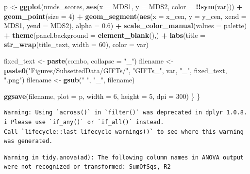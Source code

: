\documentclass[
]{book}
\newenvironment{Shaded}{\begin{snugshade}}{\end{snugshade}}
\newcommand{\AttributeTok}[1]{\textcolor[rgb]{0.13,0.29,0.53}{#1}}
\newcommand{\DecValTok}[1]{\textcolor[rgb]{0.00,0.00,0.81}{#1}}
\newcommand{\FloatTok}[1]{\textcolor[rgb]{0.00,0.00,0.81}{#1}}
\newcommand{\FunctionTok}[1]{\textcolor[rgb]{0.13,0.29,0.53}{\textbf{#1}}}
\newcommand{\NormalTok}[1]{#1}
\newcommand{\OtherTok}[1]{\textcolor[rgb]{0.56,0.35,0.01}{#1}}
\newcommand{\SpecialCharTok}[1]{\textcolor[rgb]{0.81,0.36,0.00}{\textbf{#1}}}
\newcommand{\StringTok}[1]{\textcolor[rgb]{0.31,0.60,0.02}{#1}}
\begin{document}
\begin{Shaded}
\begin{Highlighting}[]
\NormalTok{p }\OtherTok{\textless{}{-}} \FunctionTok{ggplot}\NormalTok{(nmds\_scores, }\FunctionTok{aes}\NormalTok{(}\AttributeTok{x =}\NormalTok{ MDS1, }\AttributeTok{y =}\NormalTok{ MDS2, }\AttributeTok{color =} \SpecialCharTok{!!}\FunctionTok{sym}\NormalTok{(var))) }\SpecialCharTok{+}
  \FunctionTok{geom\_point}\NormalTok{(}\AttributeTok{size =} \DecValTok{4}\NormalTok{) }\SpecialCharTok{+}
  \FunctionTok{geom\_segment}\NormalTok{(}\FunctionTok{aes}\NormalTok{(}\AttributeTok{x =}\NormalTok{ x\_cen, }\AttributeTok{y =}\NormalTok{ y\_cen,}
                   \AttributeTok{xend =}\NormalTok{ MDS1, }\AttributeTok{yend =}\NormalTok{ MDS2),}
               \AttributeTok{alpha =} \FloatTok{0.6}\NormalTok{) }\SpecialCharTok{+}
  \FunctionTok{scale\_color\_manual}\NormalTok{(}\AttributeTok{values =}\NormalTok{ palette) }\SpecialCharTok{+}
  \FunctionTok{theme}\NormalTok{(}\AttributeTok{panel.background =} \FunctionTok{element\_blank}\NormalTok{(),) }\SpecialCharTok{+}
  \FunctionTok{labs}\NormalTok{(}\AttributeTok{title =} \FunctionTok{str\_wrap}\NormalTok{(title\_text, }\AttributeTok{width =} \DecValTok{60}\NormalTok{),}
       \AttributeTok{color =}\NormalTok{ var)}
    
\NormalTok{fixed\_text }\OtherTok{\textless{}{-}} \FunctionTok{paste}\NormalTok{(combo, }\AttributeTok{collapse =} \StringTok{"\_"}\NormalTok{)}
\NormalTok{filename }\OtherTok{\textless{}{-}} \FunctionTok{paste0}\NormalTok{(}\StringTok{"Figures/SubsettedData/GIFTs/"}\NormalTok{, }\StringTok{"GIFTs\_"}\NormalTok{, var, }\StringTok{"\_"}\NormalTok{, fixed\_text, }\StringTok{".png"}\NormalTok{)}
\NormalTok{filename }\OtherTok{\textless{}{-}} \FunctionTok{gsub}\NormalTok{(}\StringTok{" "}\NormalTok{, }\StringTok{"\_"}\NormalTok{, filename)}

    \FunctionTok{ggsave}\NormalTok{(filename, }\AttributeTok{plot =}\NormalTok{ p, }\AttributeTok{width =} \DecValTok{6}\NormalTok{, }\AttributeTok{height =} \DecValTok{5}\NormalTok{, }\AttributeTok{dpi =} \DecValTok{300}\NormalTok{)    }
\NormalTok{  \}}
\NormalTok{\}}
\end{Highlighting}
\end{Shaded}

\begin{verbatim}
Warning: Using `across()` in `filter()` was deprecated in dplyr 1.0.8.
i Please use `if_any()` or `if_all()` instead.
Call `lifecycle::last_lifecycle_warnings()` to see where this warning was generated.
\end{verbatim}

\begin{verbatim}
Warning in tidy.anova(ad): The following column names in ANOVA output were not recognized or transformed: SumOfSqs, R2
\end{verbatim}
\end{document}
